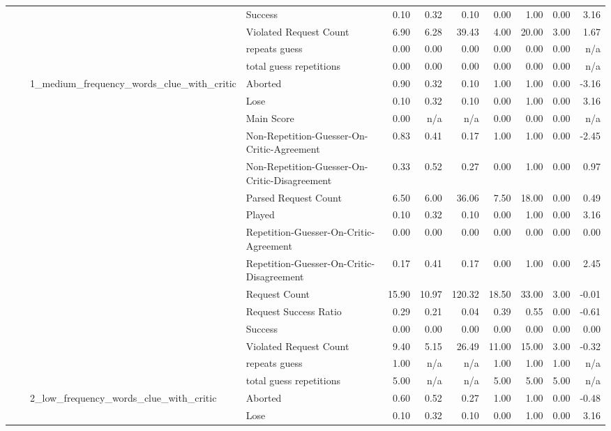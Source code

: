 \begin{tabular}{llllrrrrrrr}
 &  &  & Success & 0.10 & 0.32 & 0.10 & 0.00 & 1.00 & 0.00 & 3.16 \\
 &  &  & Violated Request Count & 6.90 & 6.28 & 39.43 & 4.00 & 20.00 & 3.00 & 1.67 \\
 &  &  & repeats guess & 0.00 & 0.00 & 0.00 & 0.00 & 0.00 & 0.00 & n/a \\
 &  &  & total guess repetitions & 0.00 & 0.00 & 0.00 & 0.00 & 0.00 & 0.00 & n/a \\
\cline{3-11}
 &  & \multirow[t]{15}{*}{1_medium_frequency_words_clue_with_critic} & Aborted & 0.90 & 0.32 & 0.10 & 1.00 & 1.00 & 0.00 & -3.16 \\
 &  &  & Lose & 0.10 & 0.32 & 0.10 & 0.00 & 1.00 & 0.00 & 3.16 \\
 &  &  & Main Score & 0.00 & n/a & n/a & 0.00 & 0.00 & 0.00 & n/a \\
 &  &  & Non-Repetition-Guesser-On-Critic-Agreement & 0.83 & 0.41 & 0.17 & 1.00 & 1.00 & 0.00 & -2.45 \\
 &  &  & Non-Repetition-Guesser-On-Critic-Disagreement & 0.33 & 0.52 & 0.27 & 0.00 & 1.00 & 0.00 & 0.97 \\
 &  &  & Parsed Request Count & 6.50 & 6.00 & 36.06 & 7.50 & 18.00 & 0.00 & 0.49 \\
 &  &  & Played & 0.10 & 0.32 & 0.10 & 0.00 & 1.00 & 0.00 & 3.16 \\
 &  &  & Repetition-Guesser-On-Critic-Agreement & 0.00 & 0.00 & 0.00 & 0.00 & 0.00 & 0.00 & 0.00 \\
 &  &  & Repetition-Guesser-On-Critic-Disagreement & 0.17 & 0.41 & 0.17 & 0.00 & 1.00 & 0.00 & 2.45 \\
 &  &  & Request Count & 15.90 & 10.97 & 120.32 & 18.50 & 33.00 & 3.00 & -0.01 \\
 &  &  & Request Success Ratio & 0.29 & 0.21 & 0.04 & 0.39 & 0.55 & 0.00 & -0.61 \\
 &  &  & Success & 0.00 & 0.00 & 0.00 & 0.00 & 0.00 & 0.00 & 0.00 \\
 &  &  & Violated Request Count & 9.40 & 5.15 & 26.49 & 11.00 & 15.00 & 3.00 & -0.32 \\
 &  &  & repeats guess & 1.00 & n/a & n/a & 1.00 & 1.00 & 1.00 & n/a \\
 &  &  & total guess repetitions & 5.00 & n/a & n/a & 5.00 & 5.00 & 5.00 & n/a \\
\cline{3-11}
 &  & \multirow[t]{15}{*}{2_low_frequency_words_clue_with_critic} & Aborted & 0.60 & 0.52 & 0.27 & 1.00 & 1.00 & 0.00 & -0.48 \\
 &  &  & Lose & 0.10 & 0.32 & 0.10 & 0.00 & 1.00 & 0.00 & 3.16 \\

\end{tabular}
